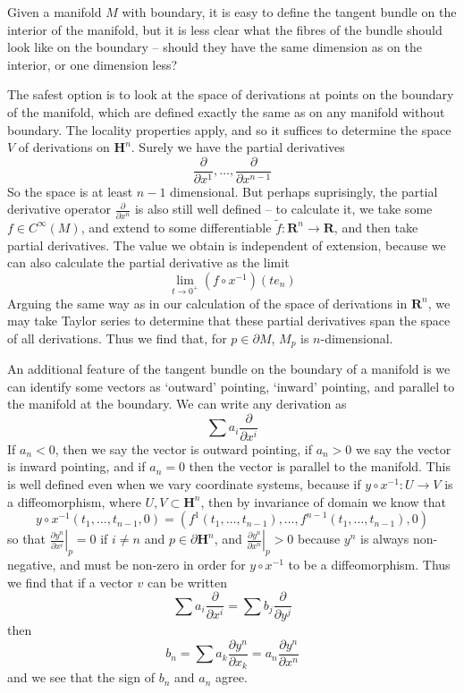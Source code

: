 Given a manifold $M$ with boundary, it is easy to define the tangent bundle on the interior of the manifold, but it is less clear what the fibres of the bundle should look like on the boundary -- should they have the same dimension as on the interior, or one dimension less?

The safest option is to look at the space of derivations at points on the boundary of the manifold, which are defined exactly the same as on any manifold without boundary. The locality properties apply, and so it suffices to determine the space $V$ of derivations on $\mathbf{H}^n$. Surely we have the partial derivatives
%
\[ \frac{\partial}{\partial x^1}, \dots, \frac{\partial}{\partial x^{n-1}} \]
%
So the space is at least $n-1$ dimensional. But perhaps suprisingly, the partial derivative operator $\frac{\partial}{\partial x^n}$ is also still well defined -- to calculate it, we take some $f \in C^\infty(M)$, and extend to some differentiable $\tilde{f}: \mathbf{R}^n \to \mathbf{R}$, and then take partial derivatives. The value we obtain is independent of extension, because we can also calculate the partial derivative as the limit
%
\[ \lim_{t \to 0^+} (f \circ x^{-1})(te_n) \]
%
Arguing the same way as in our calculation of the space of derivations in $\mathbf{R}^n$, we may take Taylor series to determine that these partial derivatives span the space of all derivations. Thus we find that, for $p \in \partial M$, $M_p$ is $n$-dimensional.

An additional feature of the tangent bundle on the boundary of a manifold is we can identify some vectors as `outward' pointing, `inward' pointing, and parallel to the manifold at the boundary. We can write any derivation as
%
\[ \sum a_i \frac{\partial}{\partial x^i} \]
%
If $a_n < 0$, then we say the vector is outward pointing, if $a_n > 0$ we say the vector is inward pointing, and if $a_n = 0$ then the vector is parallel to the manifold. This is well defined even when we vary coordinate systems, because if $y \circ x^{-1}: U \to V$ is a diffeomorphism, where $U,V \subset \mathbf{H}^n$, then by invariance of domain we know that
%
\[ y \circ x^{-1}(t_1, \dots, t_{n-1}, 0) = (f^1(t_1, \dots, t_{n-1}), \dots, f^{n-1}(t_1, \dots, t_{n-1}), 0) \]
%
so that $\left.\frac{\partial y^n}{\partial x^i}\right|_p = 0$ if $i \neq n$ and $p \in \partial \mathbf{H}^n$, and $\left. \frac{\partial y^n}{\partial x^n}\right|_p > 0$ because $y^n$ is always non-negative, and must be non-zero in order for $y \circ x^{-1}$ to be a diffeomorphism. Thus we find that if a vector $v$ can be written
%
\[ \sum a_i \frac{\partial}{\partial x^i} = \sum b_j \frac{\partial}{\partial y^j} \]
%
then
%
\[ b_n = \sum a_k \frac{\partial y^n}{\partial x_k} = a_n \frac{\partial y^n}{\partial x^n} \]
%
and we see that the sign of $b_n$ and $a_n$ agree.


